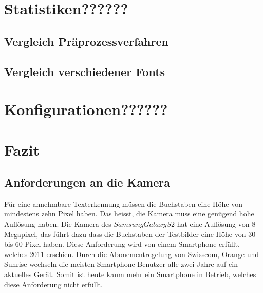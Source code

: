 \documentclass[10pt]{article}
\begin{document}
\section{Statistiken??????}

\subsection{Vergleich Präprozessverfahren}

\subsection{Vergleich verschiedener Fonts}

\section{Konfigurationen??????}

\section{Fazit}

\subsection{Anforderungen an die Kamera}
Für eine annehmbare Texterkennung müssen die Buchstaben eine Höhe von mindestens zehn Pixel haben. Das heisst, die Kamera muss eine genügend hohe Auflösung haben. Die Kamera des $Samsung Galaxy S2$ hat eine Auflösung von 8 Megapixel, das führt dazu dass die Buchstaben der Testbilder eine Höhe von 30 bis 60 Pixel haben. Diese Anforderung wird von einem Smartphone erfüllt, welches 2011 erschien. Durch die Abonementregelung von Swisscom, Orange und Sunrise wechseln die meisten Smartphone Benutzer alle zwei Jahre auf ein aktuelles Gerät. Somit ist heute kaum mehr ein Smartphone in Betrieb, welches diese Anforderung nicht erfüllt.
\end{document}
